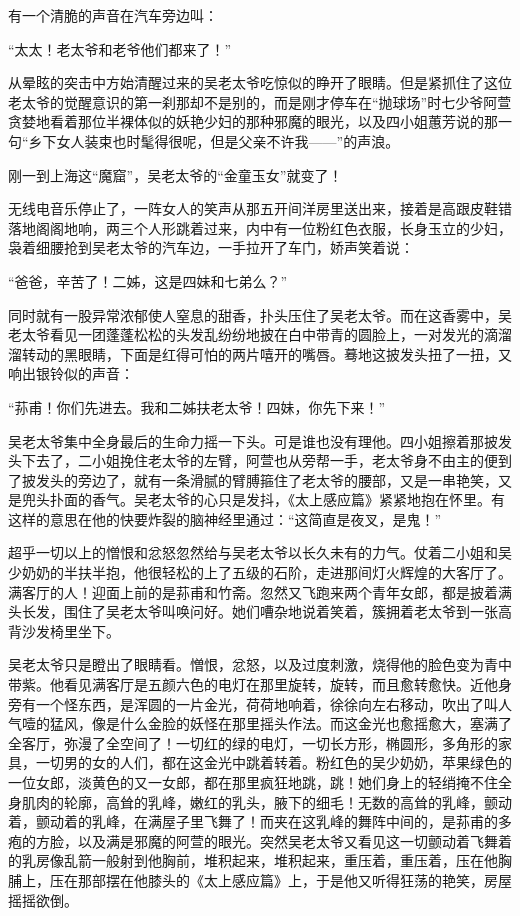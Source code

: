 \par 有一个清脆的声音在汽车旁边叫：
\par “太太！老太爷和老爷他们都来了！”
\par 从晕眩的突击中方始清醒过来的吴老太爷吃惊似的睁开了眼睛。但是紧抓住了这位老太爷的觉醒意识的第一刹那却不是别的，而是刚才停车在“抛球场”时七少爷阿萱贪婪地看着那位半裸体似的妖艳少妇的那种邪魔的眼光，以及四小姐蕙芳说的那一句“乡下女人装束也时髦得很呢，但是父亲不许我——”的声浪。
\par 刚一到上海这“魔窟”，吴老太爷的“金童玉女”就变了！
\par 无线电音乐停止了，一阵女人的笑声从那五开间洋房里送出来，接着是高跟皮鞋错落地阁阁地响，两三个人形跳着过来，内中有一位粉红色衣服，长身玉立的少妇，袅着细腰抢到吴老太爷的汽车边，一手拉开了车门，娇声笑着说：
\par “爸爸，辛苦了！二姊，这是四妹和七弟么？”
\par 同时就有一股异常浓郁使人窒息的甜香，扑头压住了吴老太爷。而在这香雾中，吴老太爷看见一团蓬蓬松松的头发乱纷纷地披在白中带青的圆脸上，一对发光的滴溜溜转动的黑眼睛，下面是红得可怕的两片嘻开的嘴唇。蓦地这披发头扭了一扭，又响出银铃似的声音：
\par “荪甫！你们先进去。我和二姊扶老太爷！四妹，你先下来！”
\par 吴老太爷集中全身最后的生命力摇一下头。可是谁也没有理他。四小姐擦着那披发头下去了，二小姐挽住老太爷的左臂，阿萱也从旁帮一手，老太爷身不由主的便到了披发头的旁边了，就有一条滑腻的臂膊箍住了老太爷的腰部，又是一串艳笑，又是兜头扑面的香气。吴老太爷的心只是发抖，《太上感应篇》紧紧地抱在怀里。有这样的意思在他的快要炸裂的脑神经里通过：“这简直是夜叉，是鬼！”
\par 超乎一切以上的憎恨和忿怒忽然给与吴老太爷以长久未有的力气。仗着二小姐和吴少奶奶的半扶半抱，他很轻松的上了五级的石阶，走进那间灯火辉煌的大客厅了。满客厅的人！迎面上前的是荪甫和竹斋。忽然又飞跑来两个青年女郎，都是披着满头长发，围住了吴老太爷叫唤问好。她们嘈杂地说着笑着，簇拥着老太爷到一张高背沙发椅里坐下。
\par 吴老太爷只是瞪出了眼睛看。憎恨，忿怒，以及过度刺激，烧得他的脸色变为青中带紫。他看见满客厅是五颜六色的电灯在那里旋转，旋转，而且愈转愈快。近他身旁有一个怪东西，是浑圆的一片金光，荷荷地响着，徐徐向左右移动，吹出了叫人气噎的猛风，像是什么金脸的妖怪在那里摇头作法。而这金光也愈摇愈大，塞满了全客厅，弥漫了全空间了！一切红的绿的电灯，一切长方形，椭圆形，多角形的家具，一切男的女的人们，都在这金光中跳着转着。粉红色的吴少奶奶，苹果绿色的一位女郎，淡黄色的又一女郎，都在那里疯狂地跳，跳！她们身上的轻绡掩不住全身肌肉的轮廓，高耸的乳峰，嫩红的乳头，腋下的细毛！无数的高耸的乳峰，颤动着，颤动着的乳峰，在满屋子里飞舞了！而夹在这乳峰的舞阵中间的，是荪甫的多疱的方脸，以及满是邪魔的阿萱的眼光。突然吴老太爷又看见这一切颤动着飞舞着的乳房像乱箭一般射到他胸前，堆积起来，堆积起来，重压着，重压着，压在他胸脯上，压在那部摆在他膝头的《太上感应篇》上，于是他又听得狂荡的艳笑，房屋摇摇欲倒。
